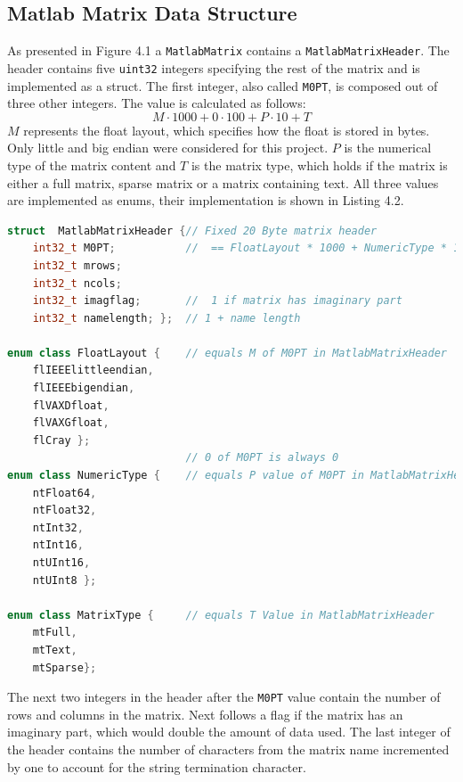 \subsection{Matlab Matrix Data Structure}
As presented in Figure 4.1 a \texttt{MatlabMatrix} contains a \texttt{MatlabMatrixHeader}. The header contains five \texttt{uint32} integers specifying the rest of the matrix and is implemented as a struct. The first integer, also called \texttt{M0PT}, is composed out of three other integers. The value is calculated as follows:
$$M\cdot1000 + 0 \cdot 100 + P\cdot 10 + T$$
$M$ represents the float layout, which specifies how the float is stored in bytes. Only little and big endian were considered for this project. $P$ is the numerical type of the matrix content and $T$ is the matrix type, which holds if the matrix is either a full matrix, sparse matrix or a matrix containing text. All three values are implemented as enums, their implementation is shown in Listing 4.2.
\vspace{1em}
\begin{lstlisting}[language=C++, caption=A code snippet showing the used enums and structs in the MATLAB header.]
struct  MatlabMatrixHeader {// Fixed 20 Byte matrix header
    int32_t M0PT;  			//  == FloatLayout * 1000 + NumericType * 10 + MatrixType
    int32_t mrows;
    int32_t ncols;
    int32_t imagflag;   	//  1 if matrix has imaginary part
    int32_t namelength; }; 	// 1 + name length

enum class FloatLayout {  	// equals M of M0PT in MatlabMatrixHeader
    flIEEElittleendian,
    flIEEEbigendian,
    flVAXDfloat,
    flVAXGfloat,
    flCray };
							// 0 of M0PT is always 0
enum class NumericType { 	// equals P value of M0PT in MatlabMatrixHeader
    ntFloat64,
    ntFloat32,
    ntInt32,
    ntInt16,
    ntUInt16,
    ntUInt8 };

enum class MatrixType {  	// equals T Value in MatlabMatrixHeader
    mtFull,
    mtText,
    mtSparse};
\end{lstlisting}
\pagebreak
The next two integers in the header after the \texttt{M0PT} value contain the number of rows and columns in the matrix. Next follows a flag if the matrix has an imaginary part, which would double the amount of data used. The last integer of the header contains the number of characters from the matrix name incremented by one to account for the string termination character.

